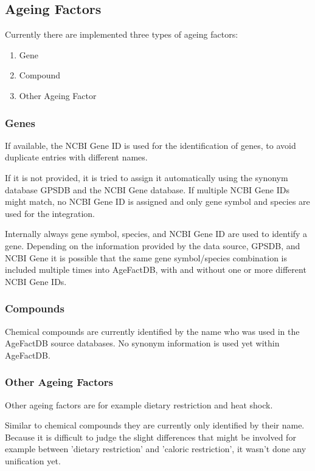 \documentclass[12pt,a4paper,notitlepage,twoside]{report}
\begin{document}
\subsection{Ageing Factors}
Currently there are implemented three types of ageing factors:
\begin{enumerate}[label=\textbf{\arabic*.}]
\item Gene
\item Compound
\item Other Ageing Factor
\end{enumerate}

\subsubsection{Genes}
If available, the NCBI Gene ID is used for the identification of genes, to avoid duplicate entries with different names.

If it is not provided, it is tried to assign it automatically using the synonym database GPSDB  and the NCBI Gene database. If multiple NCBI Gene IDs might match, no NCBI Gene ID is assigned and only gene symbol and species are used for the integration.

Internally always gene symbol, species, and NCBI Gene ID are used to identify a gene. Depending on the information provided by the data source, GPSDB, and NCBI Gene it is possible that the same gene symbol/species combination is included multiple times into AgeFactDB, with and without one or more different NCBI Gene IDs.

\subsubsection{Compounds}
Chemical compounds are currently identified by the name who was used in the AgeFactDB source databases. No synonym information is used yet within AgeFactDB.

\subsubsection{Other Ageing Factors}
Other ageing factors are for example dietary restriction and heat shock.

Similar to chemical compounds they are currently only identified by their name. Because it is difficult to judge the slight differences that might be involved for example between 'dietary restriction' and 'caloric restriction', it wasn't done any unification yet.
\end{document}
